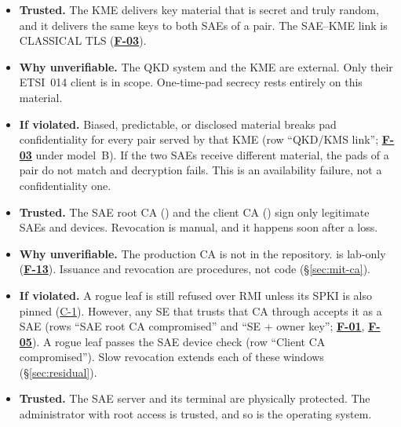 \documentclass[11pt,a4paper]{article}
\newcommand{\fid}[1]{\textbf{#1}}
\begin{document}
\begin{description}[style=nextline,leftmargin=1.2em]
\begin{itemize}
\end{itemize}
\item[TA-4 KME / QKD]\label{ta:TA-4}
\begin{itemize}
\item \textbf{Trusted.} The KME delivers key material that is secret and truly random, and it delivers the same keys to both SAEs of a pair. The SAE--KME link is CLASSICAL TLS (\hyperref[f:F-03]{\fid{F-03}}).
\item \textbf{Why unverifiable.} The QKD system and the KME are external. Only their ETSI~014 client is in scope. One-time-pad secrecy rests entirely on this material.
\item \textbf{If violated.} Biased, predictable, or disclosed material breaks pad confidentiality for every pair served by that KME (row ``QKD/KMS link''; \hyperref[f:F-03]{\fid{F-03}} under model~B). If the two SAEs receive different material, the pads of a pair do not match and decryption fails. This is an availability failure, not a confidentiality one.
\end{itemize}
\item[TA-5 Certificate authorities]\label{ta:TA-5}
\begin{itemize}
\item \textbf{Trusted.} The SAE root CA () and the client CA () sign only legitimate SAEs and devices. Revocation is manual, and it happens soon after a loss.
\item \textbf{Why unverifiable.} The production CA is not in the repository.  is lab-only (\hyperref[f:F-13]{\fid{F-13}}). Issuance and revocation are procedures, not code (\S\ref{sec:mit-ca}).
\item \textbf{If violated.} A rogue  leaf is still refused over RMI unless its SPKI is also pinned (\hyperref[c:C-1]{C-1}). However, any SE that trusts that CA through  accepts it as a SAE (rows ``SAE root CA compromised'' and ``SE + owner key''; \hyperref[f:F-01]{\fid{F-01}}, \hyperref[f:F-05]{\fid{F-05}}). A rogue  leaf passes the SAE device check (row ``Client CA compromised''). Slow revocation extends each of these windows (\S\ref{sec:residual}).
\end{itemize}
\item[TA-6 SAE server and kiosk]\label{ta:TA-6}
\begin{itemize}
\item \textbf{Trusted.} The SAE server and its terminal are physically protected. The administrator with root access is trusted, and so is the operating system.

\end{itemize}
\end{description}
\end{document}
